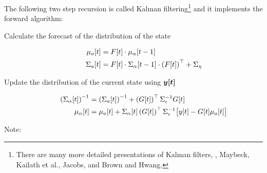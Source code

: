 The following two step recursion is called Kalman
filtering\footnote{There are many more detailed presentations of
  Kalman filters, \eg, Maybeck\cite{Maybeck82}, Kailath et
  al.\cite{KSH00}, Jacobs\cite{Jacobs93}, and Brown and
  Hwang\cite{Brown97}.} and it implements the forward algorithm: %
\newcommand{\G}{ \ti{G}{t} } \newcommand{\GT}{\left( \G
  \right)\transpose} \newcommand{\SX}{ \ti{\Sigma_a}{t} }
\begin{description}
\item[Calculate the forecast of the distribution of the state]
  \begin{subequations}
    \label{eq:KFore}
    \begin{align}
      \label{eq:KForeMu}
      {\mu_a}{[t]} &= {F}{[t]} \cdot {\mu_\alpha}{[t-1]}\\
      \label{eq:KForeSigma}
      {\Sigma_a}{[t]} &= {F}{[t]} \cdot {\Sigma_\alpha}{[t-1]}
      \cdot \left({F}{[t]}\right)^\top + \Sigma_\eta
    \end{align}
  \end{subequations}
\item[Update the distribution of the current state using
  $\bm{{y}{[t]}}$]
  \begin{subequations}
    \label{eq:KUpdate}
    \begin{align}
      \label{eq:KUpdateSigma}
      \left( \ti{\Sigma_\alpha}{t} \right)^{-1} &= \left(
        \ti{\Sigma_a}{t} \right)^{-1} + \GT \Sigma_\epsilon^{-1} \G \\
      \ti{\mu_\alpha}{t} &= \ti{\mu_a}{t} +
      \ti{\Sigma_{\alpha}}{t} \left( \ti{G}{t} \right)\transpose
      \Sigma_\epsilon^{-1} \big[\ti{y}{t} - \ti{G}{t}
      \ti{\mu_a}{t}\big]
    \end{align}
  \end{subequations}
\end{description}
Note:
